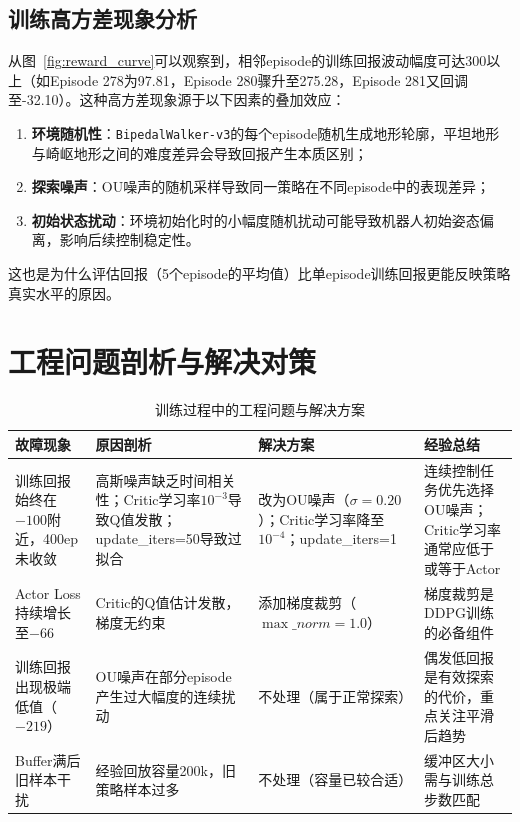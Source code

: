 \documentclass[UTF8,a4paper,12pt]{ctexart}
\begin{document}
\subsection{训练高方差现象分析}

从图~\ref{fig:reward_curve}可以观察到，相邻episode的训练回报波动幅度可达300以上（如Episode 278为97.81，Episode 280骤升至275.28，Episode 281又回调至-32.10）。这种高方差现象源于以下因素的叠加效应：
\begin{enumerate}[leftmargin=2em]
  \item \textbf{环境随机性}：\texttt{BipedalWalker-v3}的每个episode随机生成地形轮廓，平坦地形与崎岖地形之间的难度差异会导致回报产生本质区别；
  \item \textbf{探索噪声}：OU噪声的随机采样导致同一策略在不同episode中的表现差异；
  \item \textbf{初始状态扰动}：环境初始化时的小幅度随机扰动可能导致机器人初始姿态偏离，影响后续控制稳定性。
\end{enumerate}
这也是为什么评估回报（5个episode的平均值）比单episode训练回报更能反映策略真实水平的原因。

\section{工程问题剖析与解决对策}

\begin{table}[H]
\centering
\caption{训练过程中的工程问题与解决方案}
\label{tab:troubleshooting}
\begin{tabular}{p{2.8cm}p{3cm}p{3cm}p{3.2cm}}
\toprule
\textbf{故障现象} & \textbf{原因剖析} & \textbf{解决方案} & \textbf{经验总结} \\
\midrule
训练回报始终在$-100$附近，400ep未收敛 & 高斯噪声缺乏时间相关性；Critic学习率$10^{-3}$导致Q值发散；update\_iters=50导致过拟合 & 改为OU噪声（$\sigma=0.20$）；Critic学习率降至$10^{-4}$；update\_iters=1 & 连续控制任务优先选择OU噪声；Critic学习率通常应低于或等于Actor \\
\midrule
Actor Loss持续增长至$-66$ & Critic的Q值估计发散，梯度无约束 & 添加梯度裁剪（$\max\_norm=1.0$） & 梯度裁剪是DDPG训练的必备组件 \\
\midrule
训练回报出现极端低值（$-219$） & OU噪声在部分episode产生过大幅度的连续扰动 & 不处理（属于正常探索） & 偶发低回报是有效探索的代价，重点关注平滑后趋势 \\
\midrule
Buffer满后旧样本干扰 & 经验回放容量200k，旧策略样本过多 & 不处理（容量已较合适） & 缓冲区大小需与训练总步数匹配 \\
\bottomrule
\end{tabular}
\end{table}
\end{document}
